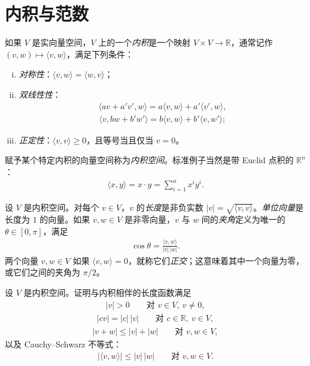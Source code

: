 \documentclass[../../main.tex]{subfiles}
\begin{document}
\section{内积与范数}\label{section:appB-inner-products-and-norms}

如果 $V$ 是实向量空间，$V$ 上的一个\emph{内积}是一个映射 $V\times V\to\mathbb R$，通常记作 $(v,w)\mapsto\langle v,w\rangle$，满足下列条件：
\begin{enumerate}[(i)]
\item \emph{对称性}：$\langle v,w\rangle=\langle w,v\rangle$；
\item \emph{双线性性}：
\begin{align*}
\langle av+a'v',w\rangle=a\langle v,w\rangle+a'\langle v',w\rangle,
\end{align*}
\begin{align*}
\langle v,bw+b'w'\rangle=b\langle v,w\rangle+b'\langle v,w'\rangle;
\end{align*}
\item \emph{正定性}：$\langle v,v\rangle\geqslant0$，且等号当且仅当 $v=0$。
\end{enumerate}

赋予某个特定内积的向量空间称为\emph{内积空间}。标准例子当然是带 Euclid 点积的 $\mathbb R^n$：
\begin{align*}
\langle x,y\rangle=x\cdot y=\sum_{i=1}^n x^i y^i.
\end{align*}

设 $V$ 是内积空间。对每个 $v\in V$，$v$ 的\emph{长度}是非负实数 $|v|=\sqrt{\langle v,v\rangle}$。\emph{单位向量}是长度为 $1$ 的向量。如果 $v,w\in V$ 是非零向量，$v$ 与 $w$ 间的\emph{夹角}定义为唯一的 $\theta\in[0,\pi]$，满足
\begin{align*}
\cos\theta=\frac{\langle v,w\rangle}{|v|\,|w|}.
\end{align*}
两个向量 $v,w\in V$ 如果 $\langle v,w\rangle=0$，就称它们\emph{正交}；这意味着其中一个向量为零，或它们之间的夹角为 $\pi/2$。

\begin{exercise}\label{exercise:appB-B-39}
设 $V$ 是内积空间。证明与内积相伴的长度函数满足
\begin{align*}
|v|>0\qquad\text{对 }v\in V,\ v\neq0,
\end{align*}
\begin{align*}
|cv|=|c|\,|v|\qquad\text{对 }c\in\mathbb R,\ v\in V,
\end{align*}
\begin{align*}
|v+w|\leqslant|v|+|w|\qquad\text{对 }v,w\in V,
\end{align*}
以及 Cauchy--Schwarz 不等式：
\begin{align*}
|\langle v,w\rangle|\leqslant|v|\,|w|\qquad\text{对 }v,w\in V.
\end{align*}
\end{exercise}
\end{document}
